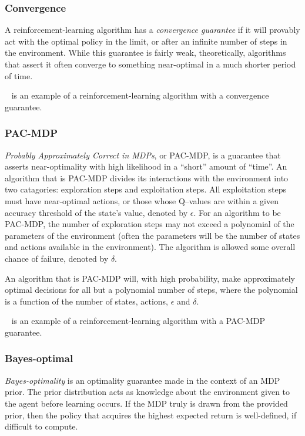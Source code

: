 \subsubsection{Convergence}

A reinforcement-learning algorithm has a \emph{convergence guarantee} if it will provably act with the optimal policy in the limit, or after an infinite number of steps in the environment. While this guarantee is fairly weak, theoretically, algorithms that assert it often converge to something near-optimal in a much shorter period of time.

~\cite{Watkins92} is an example of a reinforcement-learning algorithm with a convergence guarantee.

\subsubsection{PAC-MDP}

\emph{Probably Approximately Correct in MDPs}, or PAC-MDP, is a guarantee that asserts near-optimality with high likelihood in a ``short'' amount of ``time''. An algorithm that is PAC-MDP divides its interactions with the environment into two catagories: exploration steps and exploitation steps. All exploitation steps must have near-optimal actions, or those whose Q--values are within a given accuracy threshold of the state's value, denoted by $\epsilon$. For an algorithm to be PAC-MDP, the number of exploration steps may not exceed a polynomial of the parameters of the environment (often the parameters will be the number of states and actions available in the environment). The algorithm is allowed some overall chance of failure, denoted by $\delta$.

An algorithm that is PAC-MDP will, with high probability, make approximately optimal decisions for all but a polynomial number of steps, where the polynomial is a function of the number of states, actions, $\epsilon$ and $\delta$.

~\cite{brafman02} is an example of a reinforcement-learning algorithm with a PAC-MDP guarantee.


\subsubsection{Bayes-optimal}

\label{sec:intro:bayes-opt}

\emph{Bayes-optimality} is an optimality guarantee made in the context of an MDP prior. The prior distribution acts as knowledge about the environment given to the agent before learning occurs. If the MDP truly is drawn from the provided prior, then the policy that acquires the highest expected return is well-defined, if difficult to compute.

